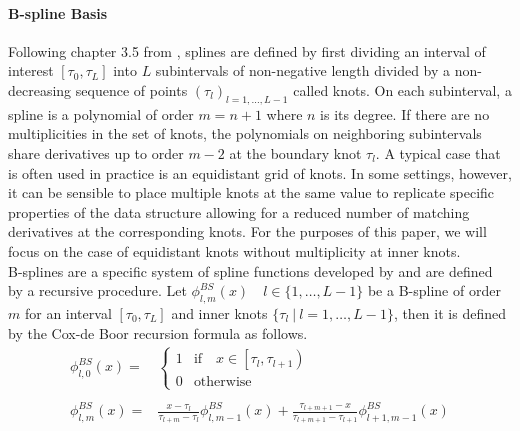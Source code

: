 \documentclass[11pt,twoside,a4paper]{article}
\begin{document}
	\paragraph{B-spline Basis} Following chapter 3.5 from \cite{ramsay_functional_2005}, splines are defined by first dividing an interval of interest $[\tau_0, \tau_L]$ into $L$ subintervals of non-negative length divided by a non-decreasing sequence of points $(\tau_l)_{l = 1,\dots, L-1}$ called knots. On each subinterval, a spline is a polynomial of order $m = n+1$ where $n$ is its degree. If there are no multiplicities in the set of knots, the polynomials on neighboring subintervals share derivatives up to order $m-2$ at the boundary knot $\tau_l$. A typical case that is often used in practice is an equidistant grid of knots. In some settings, however, it can be sensible to place multiple knots at the same value to replicate specific properties of the data structure allowing for a reduced number of matching derivatives at the corresponding knots. For the purposes of this paper, we will focus on the case of equidistant knots without multiplicity at inner knots.\\
	
	B-splines are a specific system of spline functions developed by \cite{de_boor_practical_1978} and are defined by a recursive procedure. Let $\phi_{l,m}^{BS}(x) \quad l \in \{1,\dots,L-1\}$ be a B-spline of order $m$ for an interval $[\tau_0, \tau_L]$ and inner knots $\{\tau_l \: \vert \: l = 1,\dots, L-1\}$, then it is defined by the Cox-de Boor recursion formula as follows. 
	\begin{equation}
		\begin{split}
			\phi_{l,0}^{BS}(x) = &
			\begin{cases}
				1 & \text{if} \quad x \in \left[\tau_l, \tau_{l+1}\right)\\
				0 & \text{otherwise}
			\end{cases}\\ \\
			\phi_{l,m}^{BS}(x) = &\frac{x - \tau_l}{\tau_{l+m} - \tau_l} \phi_{l,m-1}^{BS}(x) + \frac{\tau_{l+m+1} - x}{\tau_{l+m+1} - \tau_{l+1}} \phi_{l+1,m-1}^{BS}(x)
		\end{split}
	\end{equation}
	
\end{document}
